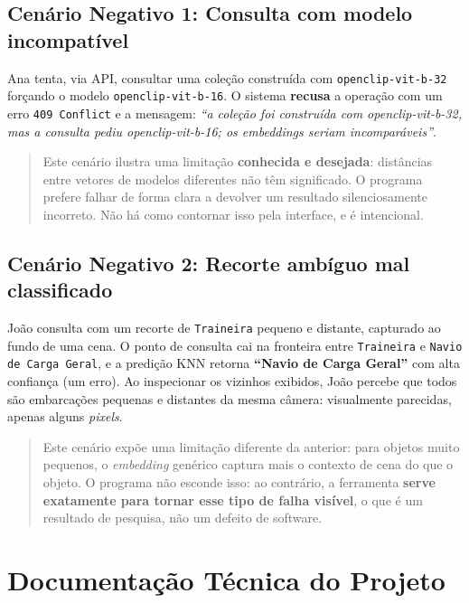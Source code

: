 \documentclass[10pt]{article}
\begin{document}
\subsection{Cenário Negativo 1: Consulta com modelo incompatível}

Ana tenta, via API, consultar uma coleção construída com
\texttt{openclip-vit-b-32} forçando o modelo \texttt{openclip-vit-b-16}. O
sistema \textbf{recusa} a operação com um erro \texttt{409 Conflict} e a
mensagem: \emph{``a coleção foi construída com openclip-vit-b-32, mas a consulta
pediu openclip-vit-b-16; os embeddings seriam incomparáveis''}.

\begin{quote}\small
Este cenário ilustra uma limitação \textbf{conhecida e desejada}: distâncias
entre vetores de modelos diferentes não têm significado. O programa prefere
falhar de forma clara a devolver um resultado silenciosamente incorreto. Não há
como contornar isso pela interface, e é intencional.
\end{quote}

\subsection{Cenário Negativo 2: Recorte ambíguo mal classificado}

João consulta com um recorte de \texttt{Traineira} pequeno e distante, capturado
ao fundo de uma cena. O ponto de consulta cai na fronteira entre
\texttt{Traineira} e \texttt{Navio de Carga Geral}, e a predição KNN retorna
\textbf{``Navio de Carga Geral''} com alta confiança (um erro). Ao inspecionar
os vizinhos exibidos, João percebe que todos são embarcações pequenas e
distantes da mesma câmera: visualmente parecidas, apenas alguns \emph{pixels}.

\begin{quote}\small
Este cenário expõe uma limitação diferente da anterior: para objetos muito
pequenos, o \emph{embedding} genérico captura mais o contexto de cena do que o
objeto. O programa não esconde isso: ao contrário, a ferramenta \textbf{serve
exatamente para tornar esse tipo de falha visível}, o que é um resultado de
pesquisa, não um defeito de software.
\end{quote}

\section{Documentação Técnica do Projeto}
\end{document}
